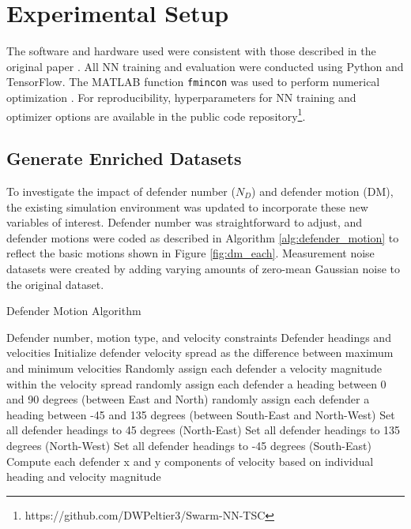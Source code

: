 \documentclass[journal]{IEEEtran} %
\newcommand{\algofontsize}{\small}  %
\begin{document}
\section{Experimental Setup}
\label{sec:exp setup}



The software and hardware used were consistent with those described in the original paper \cite{peltier_swarm_2024}. All NN training and evaluation were conducted using Python and TensorFlow. The MATLAB function \texttt{fmincon} was used to perform numerical optimization \cite{mathworks_inc_fmincon_2024}. For reproducibility, hyperparameters for NN training and optimizer options are available in the public code repository\footnote{https://github.com/DWPeltier3/Swarm-NN-TSC}.


\subsection{Generate Enriched Datasets}


To investigate the impact of defender number ($N_D$) and defender motion (DM), the existing simulation environment was updated to incorporate these new variables of interest. Defender number was straightforward to adjust, and defender motions were coded as described in Algorithm \ref{alg:defender_motion} to reflect the basic motions shown in Figure \ref{fig:dm_each}. Measurement noise datasets were created by adding varying amounts of zero-mean Gaussian noise to the original dataset.

\begin{algorithm}
\algofontsize %
\caption{Defender Motion Algorithm}
\label{alg:defender_motion}
\begin{algorithmic}[1]
\Require Defender number, motion type, and velocity constraints
\Ensure Defender headings and velocities
\State Initialize defender velocity spread as the difference between maximum and minimum velocities
\State Randomly assign each defender a velocity magnitude within the velocity spread 
    \State randomly assign each defender a heading between 0 and 90 degrees (between East and North)
    \State randomly assign each defender a heading between -45 and 135 degrees (between South-East and North-West)
    \State Set all defender headings to 45 degrees (North-East)
    \State Set all defender headings to 135 degrees (North-West)
    \State Set all defender headings to -45 degrees (South-East)
\EndIf
\State Compute each defender x and y components of velocity based on individual heading and velocity magnitude
\end{algorithmic}
\end{algorithm}
\end{document}
